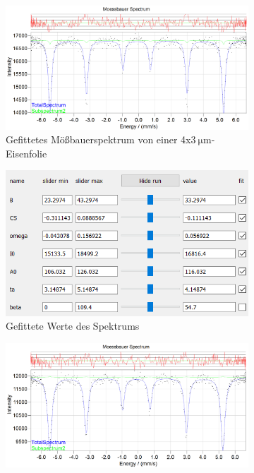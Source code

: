 \documentclass[german, %
parskip=full, %
bibliography=totoc, %
]{scrartcl}
\begin{document}
\begin{figure}[ht]
	\centering
	\begin{subfigure}[b]{0.5\textwidth}
		\includegraphics[width=\textwidth]{MoessbauerEisen4x3mitTA}
	  \caption{Gefittetes Mößbauerspektrum von einer 4x\(\SI{3}{\micro\meter}\)-Eisenfolie}
	  \label{fig:moess4x3ta}
  \end{subfigure}
  \begin{subfigure}[b]{0.4\textwidth}
	  \includegraphics[width=\textwidth]{WerteEisen4x3mitTA}
	  \caption{Gefittete Werte des Spektrums}
	  \label{fig:werte4x3ta}
  \end{subfigure}
	\begin{subfigure}[b]{0.5\textwidth}
		\includegraphics[width=\textwidth]{MoessbauerEisen25mitTA}

\end{subfigure}
\end{figure}
\end{document}
